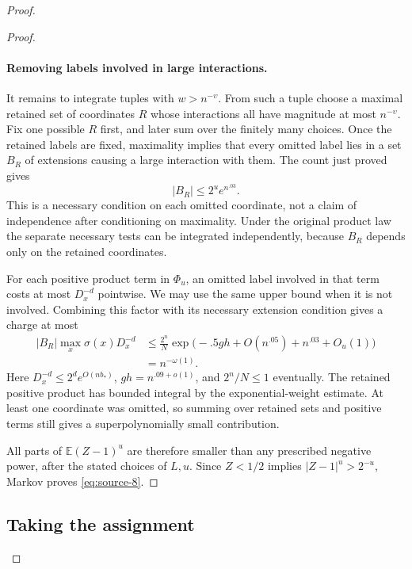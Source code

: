 \begin{proof}
\begin{proof}
\paragraph{Removing labels involved in large interactions.}
It remains to integrate tuples with \(w>n^{-\upsilon}\). From such a tuple choose a maximal retained set of coordinates \(R\) whose interactions all have magnitude at most \(n^{-\upsilon}\). Fix one possible \(R\) first, and later sum over the finitely many choices. Once the retained labels are fixed, maximality implies that every omitted label lies in a set \(B_R\) of extensions causing a large interaction with them. The count just proved gives
\[
 |B_R|\le2^u e^{n^{.03}}.
\]
This is a necessary condition on each omitted coordinate, not a claim of independence after conditioning on maximality. Under the original product law the separate necessary tests can be integrated independently, because \(B_R\) depends only on the retained coordinates.

For each positive product term in \(\Phi_u\), an omitted label involved in that term costs at most \(D_x^{-d}\) pointwise. We may use the same upper bound when it is not involved. Combining this factor with its necessary extension condition gives a charge at most
\[
 \begin{aligned}
 |B_R|\max_x\sigma(x)D_x^{-d}
 &\le\frac{2^n}{N}
       \exp\bigl(-.5gh+O(n^{.05})+n^{.03}+O_u(1)\bigr)\\
 &=n^{-\omega(1)}.
 \end{aligned}
\]
Here \(D_x^{-d}\le2^d e^{O(nb_*)}\), \(gh=n^{.09+o(1)}\), and \(2^n/N\le1\) eventually. The retained positive product has bounded integral by the exponential-weight estimate. At least one coordinate was omitted, so summing over retained sets and positive terms still gives a superpolynomially small contribution.

All parts of \(\mathbb E(Z-1)^u\) are therefore smaller than any prescribed negative power, after the stated choices of \(L,u\). Since \(Z<1/2\) implies \(|Z-1|^u>2^{-u}\), Markov proves \eqref{eq:source-8}.

\end{proof}

\subsection{Taking the assignment}
\label{sec:taking-the-assignment-jump}


\end{proof}
